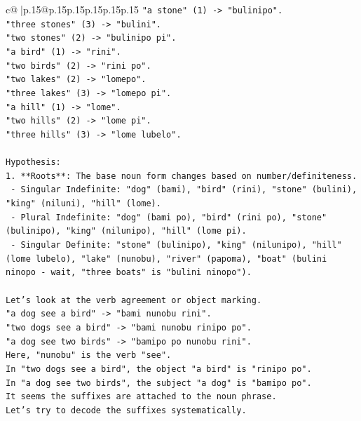 \documentclass{article}
\begin{document}
{\begin{supertabular}{c@{$\;$}|p{.15\linewidth}@{}p{.15\linewidth}p{.15\linewidth}p{.15\linewidth}p{.15\linewidth}p{.15\linewidth}}
{{{\texttt{"a stone" (1) {-}> "bulinipo".} \\
\texttt{"three stones" (3) {-}> "bulini".} \\
\texttt{"two stones" (2) {-}> "bulinipo pi".} \\
\texttt{"a bird" (1) {-}> "rini".} \\
\texttt{"two birds" (2) {-}> "rini po".} \\
\texttt{"two lakes" (2) {-}> "lomepo".} \\
\texttt{"three lakes" (3) {-}> "lomepo pi".} \\
\texttt{"a hill" (1) {-}> "lome".} \\
\texttt{"two hills" (2) {-}> "lome pi".} \\
\texttt{"three hills" (3) {-}> "lome lubelo".} \\
\\ 
\texttt{Hypothesis:} \\
\texttt{1. **Roots**: The base noun form changes based on number/definiteness.} \\
\texttt{   {-} Singular Indefinite: "dog" (bami), "bird" (rini), "stone" (bulini), "king" (niluni), "hill" (lome).} \\
\texttt{   {-} Plural Indefinite: "dog" (bami po), "bird" (rini po), "stone" (bulinipo), "king" (nilunipo), "hill" (lome pi).} \\
\texttt{   {-} Singular Definite: "stone" (bulinipo), "king" (nilunipo), "hill" (lome lubelo), "lake" (nunobu), "river" (papoma), "boat" (bulini ninopo {-} wait, "three boats" is "bulini ninopo").} \\
\\ 
\texttt{Let's look at the verb agreement or object marking.} \\
\texttt{"a dog see a bird" {-}> "bami nunobu rini".} \\
\texttt{"two dogs see a bird" {-}> "bami nunobu rinipo po".} \\
\texttt{"a dog see two birds" {-}> "bamipo po nunobu rini".} \\
\texttt{Here, "nunobu" is the verb "see".} \\
\texttt{In "two dogs see a bird", the object "a bird" is "rinipo po".} \\
\texttt{In "a dog see two birds", the subject "a dog" is "bamipo po".} \\
\texttt{It seems the suffixes are attached to the noun phrase.} \\
\texttt{Let's try to decode the suffixes systematically.} \\
}}}
\end{supertabular}}
\end{document}
